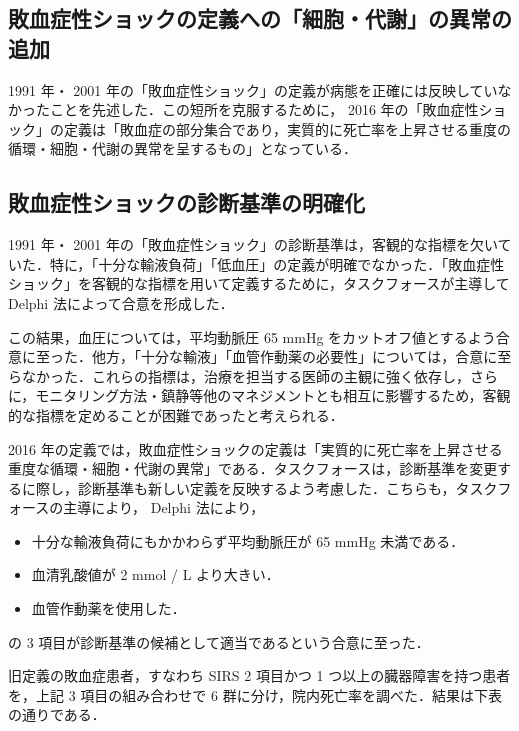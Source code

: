 \documentclass[10pt,uplatex]{jsarticle}
\begin{document}
\subsection{敗血症性ショックの定義への「細胞・代謝」の異常の追加}

1991 年・ 2001 年の「敗血症性ショック」の定義が病態を正確には反映していなかったことを先述した．この短所を克服するために， 2016 年の「敗血症性ショック」の定義は「敗血症の部分集合であり，実質的に死亡率を上昇させる重度の循環・細胞・代謝の異常を呈するもの」となっている．

\subsection{敗血症性ショックの診断基準の明確化}

1991 年・ 2001 年の「敗血症性ショック」の診断基準は，客観的な指標を欠いていた．特に，「十分な輸液負荷」「低血圧」の定義が明確でなかった．「敗血症性ショック」を客観的な指標を用いて定義するために，タスクフォースが主導して Delphi 法によって合意を形成した．

この結果，血圧については，平均動脈圧 65 mmHg をカットオフ値とするよう合意に至った．他方，「十分な輸液」「血管作動薬の必要性」については，合意に至らなかった．これらの指標は，治療を担当する医師の主観に強く依存し，さらに，モニタリング方法・鎮静等他のマネジメントとも相互に影響するため，客観的な指標を定めることが困難であったと考えられる．

2016 年の定義では，敗血症性ショックの定義は「実質的に死亡率を上昇させる重度な循環・細胞・代謝の異常」である．タスクフォースは，診断基準を変更するに際し，診断基準も新しい定義を反映するよう考慮した．こちらも，タスクフォースの主導により， Delphi 法により，

\begin{itemize}
\item 十分な輸液負荷にもかかわらず平均動脈圧が 65 mmHg 未満である．
\item 血清乳酸値が 2 mmol / L より大きい．
\item 血管作動薬を使用した．
\end{itemize}

の 3 項目が診断基準の候補として適当であるという合意に至った．

旧定義の敗血症患者，すなわち SIRS 2 項目かつ 1 つ以上の臓器障害を持つ患者を，上記 3 項目の組み合わせで 6 群に分け，院内死亡率を調べた．結果は下表の通りである．
\end{document}

